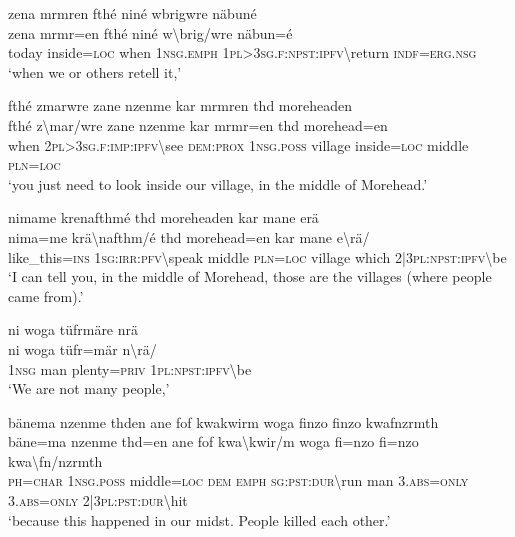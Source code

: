 \ea\label{ex:4:a1793}
zena mrmren fthé niné wbrigwre näbuné\\
\gll zena	mrmr=en	fthé	niné	w{\textbackslash}brig/wre	näbun=é\\
     today	inside=\textsc{loc}	when	1\textsc{nsg}.\textsc{emph}	1\textsc{pl}>3\textsc{sg}.\textsc{f}:\textsc{npst}:\textsc{ipfv}{\textbackslash}return	\textsc{indf}=\textsc{erg}.\textsc{nsg}\\
\glt `when we or others retell it,'
\z

\ea\label{ex:4:a1794}
fthé zmarwre zane nzenme kar mrmren thd moreheaden\\
\gll fthé	z{\textbackslash}mar/wre	zane	nzenme	kar	mrmr=en	thd	morehead=en\\
     when	2\textsc{pl}>3\textsc{sg}.\textsc{f}:\textsc{imp}:\textsc{ipfv}{\textbackslash}see	\textsc{dem}:\textsc{prox}	1\textsc{nsg}.\textsc{poss}	village	inside=\textsc{loc}	middle	\textsc{pln}=\textsc{loc}\\
\glt `you just need to look inside our village, in the middle of Morehead.'
\z

\ea\label{ex:4:a1795}
nimame krenafthmé thd moreheaden kar mane erä\\
\gll nima=me	krä{\textbackslash}nafthm/é	thd	morehead=en	kar	mane	e{\textbackslash}rä/\\
     like\_this=\textsc{ins}	1\textsc{sg}:\textsc{irr}:\textsc{pfv}{\textbackslash}speak	middle	\textsc{pln}=\textsc{loc}	village	which	2|3\textsc{pl}:\textsc{npst}:\textsc{ipfv}{\textbackslash}be\\
\glt `I can tell you, in the middle of Morehead, those are the villages (where people came from).'
\z

\ea\label{ex:4:a1796}
ni woga tüfrmäre nrä\\
\gll ni	woga	tüfr=mär	n{\textbackslash}rä/\\
     1\textsc{nsg}	man	plenty=\textsc{priv}	1\textsc{pl}:\textsc{npst}:\textsc{ipfv}{\textbackslash}be\\
\glt `We are not many people,'
\z

\ea\label{ex:4:a1797}
bänema nzenme thden ane fof kwakwirm woga finzo finzo kwafnzrmth\\
\gll bäne=ma	nzenme	thd=en	ane	fof	kwa{\textbackslash}kwir/m	woga	fi=nzo	fi=nzo	kwa{\textbackslash}fn/nzrmth\\
     \textsc{ph}=\textsc{char}	1\textsc{nsg}.\textsc{poss}	middle=\textsc{loc}	\textsc{dem}	\textsc{emph}	\textsc{sg}:\textsc{pst}:\textsc{dur}{\textbackslash}run	man	3.\textsc{abs}=\textsc{only}	3.\textsc{abs}=\textsc{only}	2|3\textsc{pl}:\textsc{pst}:\textsc{dur}{\textbackslash}hit\\
\glt `because this happened in our midst. People killed each other.'
\z

